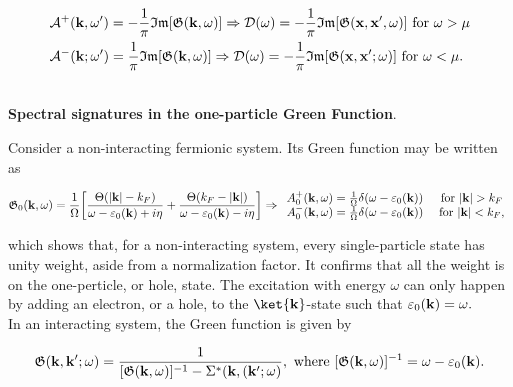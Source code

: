 \begin{equation}
    \begin{split}
        &\mathcal{A}^{+}({\bf k}, \omega') = -\frac{1}{\pi} \mathfrak{I}\mathfrak{m}[\mathfrak{G}({\bf k}, \omega)] \Rightarrow \mathcal{D}(\omega) = -\frac{1}{\pi} \mathfrak{I}\mathfrak{m}[\mathfrak{G}({\bf x}, {\bf x}', \omega)]  \textnormal{ for } \omega > \mu  \\
        &\mathcal{A}^{-}({\bf k}; \omega') = \frac{1}{\pi} \mathfrak{I}\mathfrak{m}[\mathfrak{G}({\bf k}, \omega)] \Rightarrow \mathcal{D}(\omega) = -\frac{1}{\pi} \mathfrak{I}\mathfrak{m}[\mathfrak{G}({\bf x}, {\bf x}'; \omega)]  \textnormal{ for } \omega < \mu.
    \end{split}
\end{equation}

\blanky \\

\textbf{Spectral signatures in the one-particle Green Function}. 

Consider a non-interacting fermionic system. Its Green function may be written as 

\begin{equation}
    \mathfrak{G}_0({\bf k}, \omega) = \frac{1}{\Omega} \bigg[\frac{\Theta(|{\bf k}| - k_F)}{\omega - \varepsilon_0({\bf k}) + i \eta} + \frac{\Theta(k_F-|{\bf k}|)}{\omega - \varepsilon_0({\bf k}) - i \eta}\bigg] \Rightarrow \begin{array}{cc}
        A_0^+({\bf k}, \omega) = \frac{1}{\Omega} \delta(\omega - \varepsilon_0({\bf k})) & \textnormal{ for } |{\bf k}| > k_F \\
        A_0^-({\bf k}, \omega) = \frac{1}{\Omega} \delta(\omega - \varepsilon_0({\bf k})) & \textnormal{ for } |{\bf k}| < k_F,
    \end{array}
\end{equation}

which shows that, for a non-interacting system, every single-particle state has unity weight, aside from a normalization factor. It confirms that all the weight is on the one-perticle, or hole, state. The excitation with energy $\omega$ can only happen by adding an electron, or a hole, to the $\ket{{\bf k}}$-state such that $\varepsilon_0({\bf k}) = \omega.$ \\

In an interacting system, the Green function is given by 

\begin{equation}
    \mathfrak{G}({\bf k}, {\bf k}'; \omega) = \frac{1}{[\mathfrak{G}({\bf k}, \omega)]^{-1} - \Sigma^{*}({\bf k}, ({\bf k}'; \omega)}, \textnormal{ where } [\mathfrak{G}({\bf k}, \omega)]^{-1} = \omega - \varepsilon_0({\bf k}).
    \label{Feynmann_diags_spectral_functions}
\end{equation}
 
